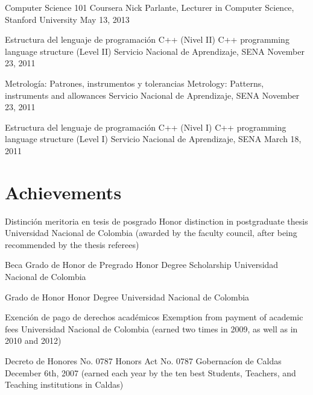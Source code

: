 \documentclass[12pt,english]{moderncv}
\begin{document}
        {Computer Science 101}
        {}
        {Coursera}
        {Nick Parlante, Lecturer in Computer Science, Stanford University}
        {May 13, 2013}

        {Estructura del lenguaje de programación C++ (Nivel II)}
        {C++ programming language structure (Level II)}
        {Servicio Nacional de Aprendizaje, SENA}
        {}
        {November 23, 2011}

        {Metrología: Patrones, instrumentos y tolerancias}
        {Metrology: Patterns, instruments and allowances}
        {Servicio Nacional de Aprendizaje, SENA}
        {}
        {November 23, 2011}

        {Estructura del lenguaje de programación C++ (Nivel I)}
        {C++ programming language structure (Level I)}
        {Servicio Nacional de Aprendizaje, SENA}
        {}
        {March 18, 2011}


\section{Achievements}

        {Distinción meritoria en tesis de posgrado}
        {Honor distinction in postgraduate thesis}
        {Universidad Nacional de Colombia}
        {}
        {(awarded by the faculty council, after being recommended by the thesis referees)}

        {Beca Grado de Honor de Pregrado}
        {Honor Degree Scholarship}
        {Universidad Nacional de Colombia}
        {}
        {}

        {Grado de Honor}
        {Honor Degree}
        {Universidad Nacional de Colombia}
        {}
        {}


        {Exención de pago de derechos académicos}
        {Exemption from payment of academic fees}
        {Universidad Nacional de Colombia}
        {}
        {(earned two times in 2009, as well as in 2010 and 2012)}


        {Decreto de Honores No. 0787}
        {Honors Act No. 0787}
        {Gobernacíon de Caldas}
        {December 6th, 2007}
        {(earned each year by the ten best Students, Teachers, and Teaching institutions in Caldas)}
\end{document}
